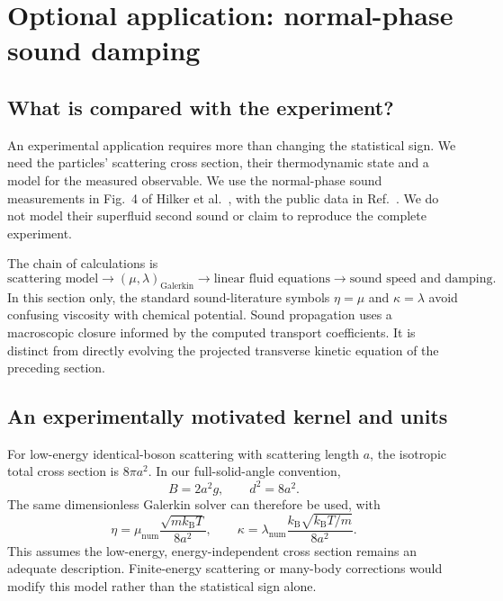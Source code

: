 \section{Optional application: normal-phase sound damping}
\label{qt:hilker}
\subsection{What is compared with the experiment?}
An experimental application requires more than changing the statistical sign.
We need the particles' scattering cross section, their thermodynamic state and
a model for the measured observable. We use the normal-phase sound measurements
in Fig.~4 of Hilker et al.\ \cite{qtHilker}, with the public data in
Ref.~\cite{qtHilkerData}. We do not model their superfluid second sound or
claim to reproduce the complete experiment.

The chain of calculations is
\[
 \text{scattering model}
 \longrightarrow(\mu,\lambda)_{\mathrm{Galerkin}}
 \longrightarrow\text{linear fluid equations}
 \longrightarrow\text{sound speed and damping}.
\]
In this section only, the standard sound-literature symbols
$\eta=\mu$ and $\kappa=\lambda$ avoid confusing viscosity with chemical
potential. Sound propagation uses a macroscopic closure informed by the
computed transport coefficients. It is distinct from directly evolving the
projected transverse kinetic equation of the preceding section.

\subsection{An experimentally motivated kernel and units}
For low-energy identical-boson scattering with scattering length $a$, the
isotropic total cross section is $8\pi a^2$. In our full-solid-angle convention,
\begin{equation}
 B=2a^2g,\qquad d^2=8a^2.
\end{equation}
The same dimensionless Galerkin solver can therefore be used, with
\begin{equation}
 \eta=\mu_{\mathrm{num}}\frac{\sqrt{mk_{\mathrm B}T}}{8a^2},\qquad
 \kappa=\lambda_{\mathrm{num}}
              \frac{k_{\mathrm B}\sqrt{k_{\mathrm B}T/m}}{8a^2}.
 \label{qt:atomunits}
\end{equation}
This assumes the low-energy, energy-independent cross section remains an
adequate description. Finite-energy scattering or many-body corrections
would modify this model rather than the statistical sign alone.

